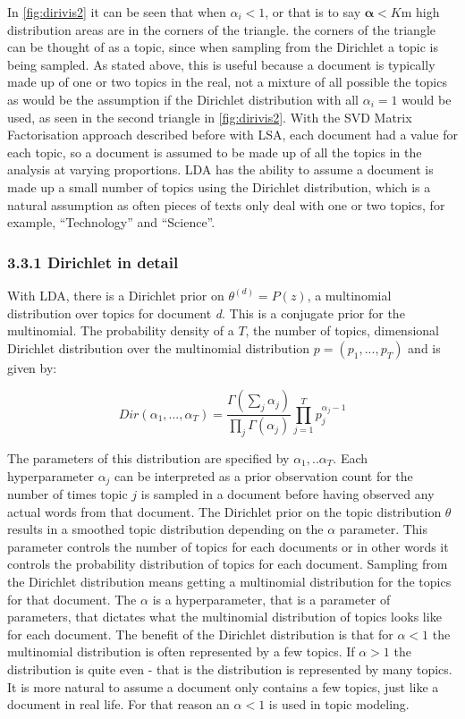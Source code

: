 \documentclass[
]{article}
\begin{document}
In \ref{fig:dirivis2} it can be seen that when \(\alpha_i < 1\), or that
is to say \(\boldsymbol{\alpha} < K\)m high distribution areas are in
the corners of the triangle. the corners of the triangle can be thought
of as a topic, since when sampling from the Dirichlet a topic is being
sampled. As stated above, this is useful because a document is typically
made up of one or two topics in the real, not a mixture of all possible
the topics as would be the assumption if the Dirichlet distribution with
all \(\alpha_i = 1\) would be used, as seen in the second triangle in
\ref{fig:dirivis2}. With the SVD Matrix Factorisation approach described
before with LSA, each document had a value for each topic, so a document
is assumed to be made up of all the topics in the analysis at varying
proportions. LDA has the ability to assume a document is made up a small
number of topics using the Dirichlet distribution, which is a natural
assumption as often pieces of texts only deal with one or two topics,
for example, ``Technology'' and ``Science''.

\hypertarget{dirichlet-in-detail}{%
\subsubsection{3.3.1 Dirichlet in detail}\label{dirichlet-in-detail}}

With LDA, there is a Dirichlet prior on \({\theta}^{(d)} = P(z)\), a
multinomial distribution over topics for document \emph{d}. This is a
conjugate prior for the multinomial. The probability density of a \(T\),
the number of topics, dimensional Dirichlet distribution over the
multinomial distribution \(p=(p_1,...,p_T)\) and is given by:

\begin{equation}
Dir(\alpha_1,...,\alpha_T) =  \frac{\Gamma(\sum_{j}^{}\alpha_j)}{\prod_{j}^{}\Gamma(\alpha_j)}\prod_{j=1}^{T}p_j^{\alpha_j -1}
\end{equation}

The parameters of this distribution are specified by
\(\alpha_1,..\alpha_T\). Each hyperparameter \(\alpha_j\) can be
interpreted as a prior observation count for the number of times topic
\(j\) is sampled in a document before having observed any actual words
from that document. The Dirichlet prior on the topic distribution
\(\theta\) results in a smoothed topic distribution depending on the
\(\alpha\) parameter. This parameter controls the number of topics for
each documents or in other words it controls the probability
distribution of topics for each document. Sampling from the Dirichlet
distribution means getting a multinomial distribution for the topics for
that document. The \(\alpha\) is a hyperparameter, that is a parameter
of parameters, that dictates what the multinomial distribution of topics
looks like for each document. The benefit of the Dirichlet distribution
is that for \(\alpha<1\) the multinomial distribution is often
represented by a few topics. If \(\alpha>1\) the distribution is quite
even - that is the distribution is represented by many topics. It is
more natural to assume a document only contains a few topics, just like
a document in real life. For that reason an \(\alpha<1\) is used in
topic modeling.
\end{document}
